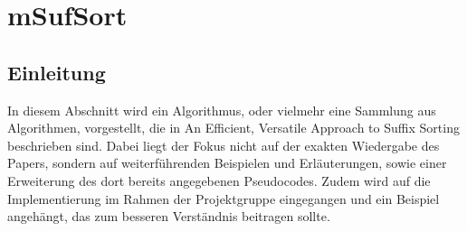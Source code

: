 \section{mSufSort}

\subsection{Einleitung}

In  diesem Abschnitt wird ein Algorithmus, oder vielmehr eine Sammlung aus Algorithmen, vorgestellt, die in \glqq An Efficient, Versatile Approach to Suffix Sorting\grqq \cite{saca:8} beschrieben sind. Dabei liegt der Fokus nicht auf der exakten Wiedergabe des Papers, sondern auf weiterführenden Beispielen und Erläuterungen, sowie einer Erweiterung des dort bereits angegebenen Pseudocodes. Zudem wird auf die Implementierung im Rahmen der Projektgruppe eingegangen und ein Beispiel angehängt, das zum besseren Verständnis beitragen sollte.\\

